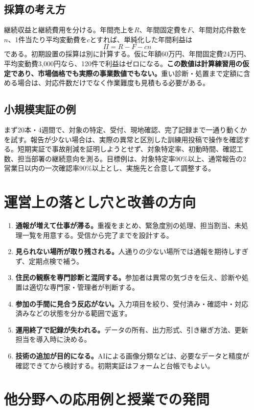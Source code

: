 \documentclass[a4paper,11pt]{ltjsarticle}
\begin{document}
\subsection{採算の考え方}
継続収益と継続費用を分ける。年間売上を$R$、年間固定費を$F$、年間対応件数を$n$、1件当たり平均変動費を$c$とすれば、単純化した年間利益は
\[
\Pi=R-F-cn
\]
である。初期設置の採算は別に計算する。仮に年額60万円、年間固定費24万円、平均変動費3,000円なら、120件で利益はゼロになる。\textbf{この数値は計算練習用の仮定であり、市場価格でも実際の事業数値でもない。}重い診断・処置まで定額に含める場合は、対応件数だけでなく作業難度も見積もる必要がある。

\subsection{小規模実証の例}
まず20本・4週間で、対象の特定、受付、現地確認、完了記録まで一通り動くかを試す。報告が少ない場合は、実際の異常と区別した訓練用投稿で操作を確認する。短期実証で事故削減を証明しようとせず、対象特定率、初動時間、確認工数、担当部署の継続意向を測る。目標例は、対象特定率90\%以上、通常報告の2営業日以内の一次確認率90\%以上とし、実施先と合意して調整する。

\clearpage
\section{運営上の落とし穴と改善の方向}
\begin{enumerate}
\item \textbf{通報が増えて仕事が滞る。}重複をまとめ、緊急度別の処理、担当割当、未処理一覧を用意する。受信から完了までを設計する。
\item \textbf{見られない場所が取り残される。}人通りの少ない場所では通報を期待しすぎず、定期点検で補う。
\item \textbf{住民の観察を専門診断と混同する。}参加者は異常の気づきを伝え、診断や処置は適切な専門家・管理者が判断する。
\item \textbf{参加の手間に見合う反応がない。}入力項目を絞り、受付済み・確認中・対応済みなどの状態を分かる範囲で返す。
\item \textbf{運用終了で記録が失われる。}データの所有、出力形式、引き継ぎ方法、更新担当を導入時に決める。
\item \textbf{技術の追加が目的になる。}AIによる画像分類などは、必要なデータと精度が確認できてから検討する。初期実証はフォームと台帳でもよい。
\end{enumerate}

\section{他分野への応用例と授業での発問}
\end{document}
